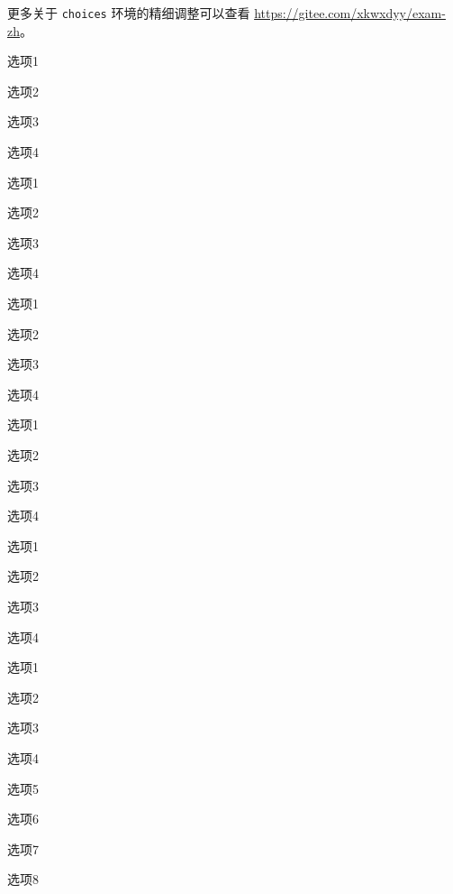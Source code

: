 更多关于 \verb|choices| 环境的精细调整可以查看 \url{https://gitee.com/xkwxdyy/exam-zh}。

\begin{choices}[label = \arabic*)]
  \item 选项1
  \item 选项2
  \item 选项3
  \item 选项4
\end{choices}

\begin{choices}[label = (\alph*]
  \item 选项1
  \item 选项2
  \item 选项3
  \item 选项4
\end{choices}

\begin{choices}[label = \Alph*.]
  \item 选项1
  \item 选项2
  \item 选项3
  \item 选项4
\end{choices}

\begin{choices}[label = \roman*:]
  \item 选项1
  \item 选项2
  \item 选项3
  \item 选项4
\end{choices}

\begin{choices}[label = \Roman*-]
  \item 选项1
  \item 选项2
  \item 选项3
  \item 选项4
\end{choices}

\begin{choices}[label = \circlednumber*]
  \item 选项1
  \item 选项2
  \item 选项3
  \item 选项4
  \item 选项5
  \item 选项6
  \item 选项7
  \item 选项8
\end{choices}


